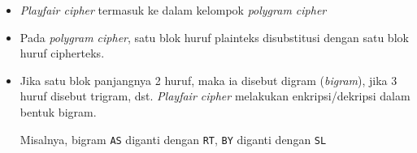 \documentclass{article}
\begin{document}

\begin{itemize}
    \item \textit{Playfair cipher} termasuk ke dalam kelompok \textit{polygram cipher}
    \item Pada \textit{polygram cipher}, satu blok huruf plainteks disubstitusi dengan satu blok huruf cipherteks.
    \item Jika satu blok panjangnya 2 huruf, maka ia disebut digram (\textit{bigram}), jika 3 huruf disebut trigram, dst. \textit{Playfair cipher} melakukan enkripsi/dekripsi dalam bentuk bigram.

    Misalnya, bigram \texttt{AS} diganti dengan \texttt{RT}, \texttt{BY} diganti dengan \texttt{SL}
\end{itemize}
\end{document}
